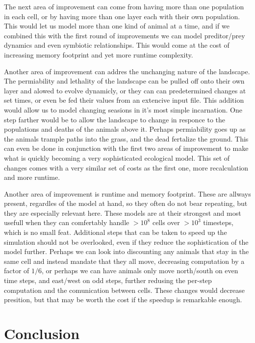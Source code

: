 \documentclass[twocolumn]{article}
\begin{document}
The next area of improvement can come from having more than one population in each cell, or by having more than one layer each with their own population. This would let us model more than one kind of animal at a time, and if we combined this with the first round of improvements we can model preditor/prey dynamics and even symbiotic relationships. This would come at the cost of increasing memory footprint and yet more runtime complexity.

Another area of improvement can addres the unchanging nature of the landscape. The permiability and lethality of the landscape can be pulled off onto their own layer and alowed to evolve dynamicly, or they can can predetermined changes at set times, or even be fed their values from an extencive input file. This addition would allow us to model changing seasions in it's most simple incarnation. One step farther would be to allow the landscape to change in responce to the populations and deaths of the animals above it. Perhaps permiability goes up as the animals trample paths into the grass, and the dead fertalize the ground. This can even be done in conjunction with the first two areas of improvement to make what is quickly becoming a very sophisticated ecological model. This set of changes comes with a very similar set of costs as the first one, more recalculation and more runtime.

Another area of improvement is runtime and memory footprint. These are allways present, regardles of the model at hand, so they often do not bear repeating, but they are especially relevant here. These models are at their strongest and most usefull when they can comfertably handle $>$$10^{8}$ cells over $>$$10^{3}$ timesteps, which is no small feat. Additional steps that can be taken to speed up the simulation should not be overlooked, even if they reduce the sophistication of the model further. Perhaps we can look into discounting any animals that stay in the same cell and instead mandate that they all move, decreasing computation by a factor of $1/6$, or perhaps we can have animals only move north/south on even time steps, and east/west on odd steps, further redusing the per-step computation and the comunication between cells. These changes would decrease presition, but that may be worth the cost if the speedup is remarkable enough.

\section{Conclusion}
\end{document}
